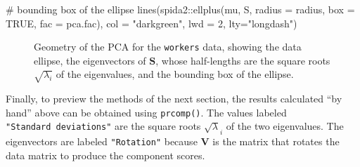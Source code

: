 \documentclass[
  letterpaper,
  10pt,
  krantz2]{krantz}
\makeatletter
\newenvironment{Shaded}{\begin{snugshade}}{\end{snugshade}}
\newcommand{\AttributeTok}[1]{\textcolor[rgb]{0.40,0.45,0.13}{#1}}
\newcommand{\CommentTok}[1]{\textcolor[rgb]{0.37,0.37,0.37}{#1}}
\newcommand{\ConstantTok}[1]{\textcolor[rgb]{0.56,0.35,0.01}{#1}}
\newcommand{\DecValTok}[1]{\textcolor[rgb]{0.68,0.00,0.00}{#1}}
\newcommand{\FunctionTok}[1]{\textcolor[rgb]{0.28,0.35,0.67}{#1}}
\newcommand{\NormalTok}[1]{\textcolor[rgb]{0.00,0.23,0.31}{#1}}
\newcommand{\SpecialCharTok}[1]{\textcolor[rgb]{0.37,0.37,0.37}{#1}}
\newcommand{\StringTok}[1]{\textcolor[rgb]{0.13,0.47,0.30}{#1}}
\newenvironment{kframe}{%
  \medskip{}
  \setlength{\fboxsep}{.8em}
  \def\at@end@of@kframe{}%
  \ifinner\ifhmode%
  \def\at@end@of@kframe{\end{minipage}}%
  \begin{minipage}{\columnwidth}%
  \fi\fi%
  \def\FrameCommand##1{\hskip\@totalleftmargin \hskip-\fboxsep
  \colorbox{shadecolor}{##1}\hskip-\fboxsep
      \hskip-\linewidth \hskip-\@totalleftmargin \hskip\columnwidth}%
  \MakeFramed {\advance\hsize-\width
    \@totalleftmargin\z@ \linewidth\hsize
    \@setminipage}}%
{\par\unskip\endMakeFramed%
  \at@end@of@kframe}
\renewenvironment{Shaded}{\begin{kframe}}{\end{kframe}}
\makeatother
\begin{document}
\begin{Shaded}
\begin{Highlighting}[]
\CommentTok{\# bounding box of the ellipse}
\FunctionTok{lines}\NormalTok{(spida2}\SpecialCharTok{::}\FunctionTok{ellplus}\NormalTok{(mu, S, }\AttributeTok{radius =}\NormalTok{ radius,}
              \AttributeTok{box =} \ConstantTok{TRUE}\NormalTok{, }\AttributeTok{fac =}\NormalTok{ pca.fac),}
      \AttributeTok{col =} \StringTok{"darkgreen"}\NormalTok{,}
      \AttributeTok{lwd =} \DecValTok{2}\NormalTok{, }\AttributeTok{lty=}\StringTok{"longdash"}\NormalTok{)}
\end{Highlighting}
\end{Shaded}

\begin{figure}


\caption{\label{fig-workers-pca}Geometry of the PCA for the
\texttt{workers} data, showing the data ellipse, the eigenvectors of
\(\mathbf{S}\), whose half-lengths are the square roots
\(\sqrt{\lambda_i}\) of the eigenvalues, and the bounding box of the
ellipse.}

\end{figure}%

Finally, to preview the methods of the next section, the results
calculated ``by hand'' above can be obtained using \texttt{prcomp()}.
The values labeled \texttt{"Standard\ deviations"} are the square roots
\(\sqrt{\lambda}_i\) of the two eigenvalues. The eigenvectors are
labeled \texttt{"Rotation"} because \(\mathbf{V}\) is the matrix that
rotates the data matrix to produce the component scores.
\end{document}
